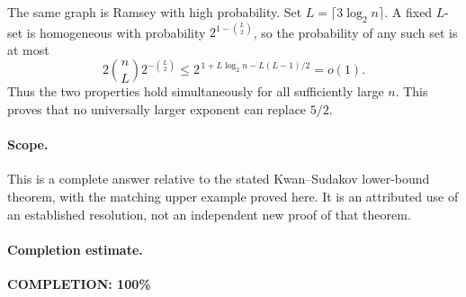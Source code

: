 The same graph is Ramsey with high probability. Set
\(L=\lceil3\log_2 n\rceil\). A fixed \(L\)-set is homogeneous with
probability \(2^{1-\binom L2}\), so the probability of any such set is
at most
\[
 2\binom nL2^{-\binom L2}
 \leq2^{\,1+L\log_2 n-L(L-1)/2}=o(1).
\]
Thus the two properties hold simultaneously for all sufficiently
large \(n\). This proves that no universally larger exponent can
replace \(5/2\).

\paragraph{Scope.}
This is a complete answer relative to the stated
Kwan--Sudakov lower-bound theorem, with the matching upper example
proved here. It is an attributed use of an established resolution,
not an independent new proof of that theorem.

\paragraph{Completion estimate.}
\textbf{COMPLETION: 100\%}
